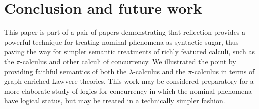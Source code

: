 \documentclass[a4paper,UKenglish]{lipics-v2016}
\newcommand{\pic}{$\pi$-calculus}
\begin{document}
\section{Conclusion and future work}
This paper is part of a pair of papers demonstrating that reflection
provides a powerful technique for treating nominal phenomena as
syntactic sugar, thus paving the way for simpler semantic treatments
of richly featured calculi, such as the {\pic} and other calculi of
concurrency. We illustrated the point by providing faithful semantics
of both the $\lambda$-calculus and the {\pic} in terms of graph-enriched
Lawvere theories. This work may be considered preparatory for a more
elaborate study of logics for concurrency in which the nominal
phenomena have logical status, but may be treated in a technically
simpler fashion.
\end{document}
